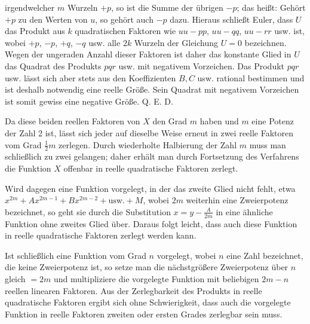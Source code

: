 irgendwelcher $m$ Wurzeln $+p$, so ist die Summe der übrigen $-p$; das heißt: Gehört $+p$ zu den Werten von $u$, so gehört auch $-p$ dazu. Hieraus schließt Euler, dass $U$ das Produkt aus $k$ quadratischen Faktoren wie $uu-pp$, $uu-qq$, $uu-rr$ usw. ist, wobei $+p$, $-p$, $+q$, $-q$ usw. alle $2k$ Wurzeln der Gleichung $U=0$ bezeichnen. Wegen der ungeraden Anzahl dieser Faktoren ist daher das konstante Glied in $U$ das Quadrat des Produkts $pqr$ usw. mit negativem Vorzeichen. Das Produkt $pqr$ usw. lässt sich aber stets aus den Koeffizienten $B,C$ usw. rational bestimmen und ist deshalb notwendig eine reelle Größe. Sein Quadrat mit negativem Vorzeichen ist somit gewiss eine negative Größe. Q. E. D.

Da diese beiden reellen Faktoren von $X$ den Grad $m$ haben und $m$ eine Potenz der Zahl 2 ist, lässt sich jeder auf dieselbe Weise erneut in zwei reelle Faktoren vom Grad $\frac12m$ zerlegen. Durch wiederholte Halbierung der Zahl $m$ muss man schließlich zu zwei gelangen; daher erhält man durch Fortsetzung des Verfahrens die Funktion $X$ offenbar in reelle quadratische Faktoren zerlegt.

Wird dagegen eine Funktion vorgelegt, in der das zweite Glied nicht fehlt, etwa $x^{2m}+Ax^{2m-1}+Bx^{2m-2}+\text{usw.}+M$, wobei $2m$ weiterhin eine Zweierpotenz bezeichnet, so geht sie durch die Substitution $x=y-\frac{A}{2m}$ in eine ähnliche Funktion ohne zweites Glied über. Daraus folgt leicht, dass auch diese Funktion in reelle quadratische Faktoren zerlegt werden kann.

Ist schließlich eine Funktion vom Grad $n$ vorgelegt, wobei $n$ eine Zahl bezeichnet, die keine
Zweierpotenz ist, so setze man die nächstgrößere Zweierpotenz über $n$ gleich $=2m$ und multipliziere die vorgelegte Funktion mit beliebigen $2m-n$ reellen linearen Faktoren. Aus der Zerlegbarkeit des Produkts in reelle quadratische Faktoren ergibt sich ohne Schwierigkeit, dass auch die vorgelegte Funktion in reelle Faktoren zweiten oder ersten Grades zerlegbar sein muss.
